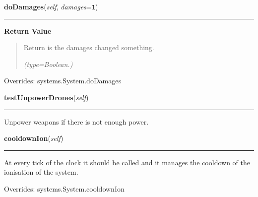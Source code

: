     \vspace{0.5ex}

\hspace{.8\funcindent}\begin{boxedminipage}{\funcwidth}

    \raggedright \textbf{doDamages}(\textit{self}, \textit{damages}={\tt 1})

    \vspace{-1.5ex}

    \rule{\textwidth}{0.5\fboxrule}
\setlength{\parskip}{2ex}
\setlength{\parskip}{1ex}
      \textbf{Return Value}
    \vspace{-1ex}

      \begin{quote}
      Return is the damages changed something.

      {\it (type=Boolean.)}

      \end{quote}

      Overrides: systems.System.doDamages

    \end{boxedminipage}

    \label{systems:DroneControl:testUnpowerDrones}

    \vspace{0.5ex}

\hspace{.8\funcindent}\begin{boxedminipage}{\funcwidth}

    \raggedright \textbf{testUnpowerDrones}(\textit{self})

    \vspace{-1.5ex}

    \rule{\textwidth}{0.5\fboxrule}
\setlength{\parskip}{2ex}
    Unpower weapons if there is not enough power.

\setlength{\parskip}{1ex}
    \end{boxedminipage}

    \vspace{0.5ex}

\hspace{.8\funcindent}\begin{boxedminipage}{\funcwidth}

    \raggedright \textbf{cooldownIon}(\textit{self})

    \vspace{-1.5ex}

    \rule{\textwidth}{0.5\fboxrule}
\setlength{\parskip}{2ex}
    At every tick of the clock it should be called and it manages the 
    cooldown of the ionisation of the system.

\setlength{\parskip}{1ex}
      Overrides: systems.System.cooldownIon

    \end{boxedminipage}

